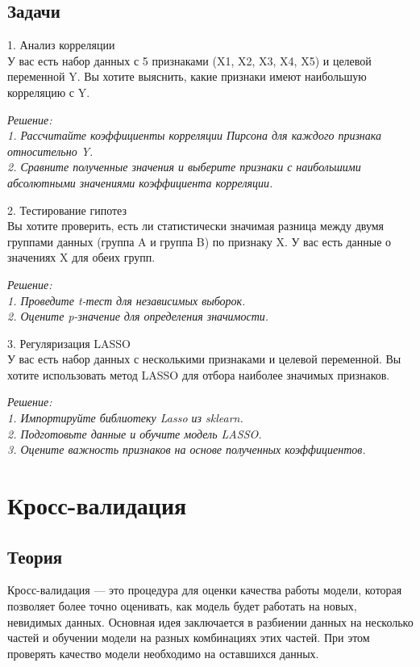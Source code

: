 \subsection{Задачи}

1. Анализ корреляции\\
У вас есть набор данных с 5 признаками (X1, X2, X3, X4, X5) и целевой переменной Y. Вы хотите выяснить, какие признаки имеют наибольшую корреляцию с Y.

\textit{Решение:\\
1. Рассчитайте коэффициенты корреляции Пирсона для каждого признака относительно Y.\\
2. Сравните полученные значения и выберите признаки с наибольшими абсолютными значениями коэффициента корреляции.}
   
2. Тестирование гипотез\\
Вы хотите проверить, есть ли статистически значимая разница между двумя группами данных (группа A и группа B) по признаку X. У вас есть данные о значениях X для обеих групп.

\textit{Решение:\\
1. Проведите t-тест для независимых выборок.\\
2. Оцените p-значение для определения значимости.}

3. Регуляризация LASSO \\
У вас есть набор данных с несколькими признаками и целевой переменной. Вы хотите использовать метод LASSO для отбора наиболее значимых признаков.

\textit{Решение:\\
1. Импортируйте библиотеку Lasso из sklearn.\\
2. Подготовьте данные и обучите модель LASSO.\\
3. Оцените важность признаков на основе полученных коэффициентов.\\}


\section{Кросс-валидация}

\subsection{Теория}

Кросс-валидация — это процедура для оценки качества работы модели, которая позволяет более точно оценивать, как модель будет работать на новых, невидимых данных. Основная идея заключается в разбиении данных на несколько частей и обучении модели на разных комбинациях этих частей. При этом  проверять качество модели необходимо на оставшихся данных.

